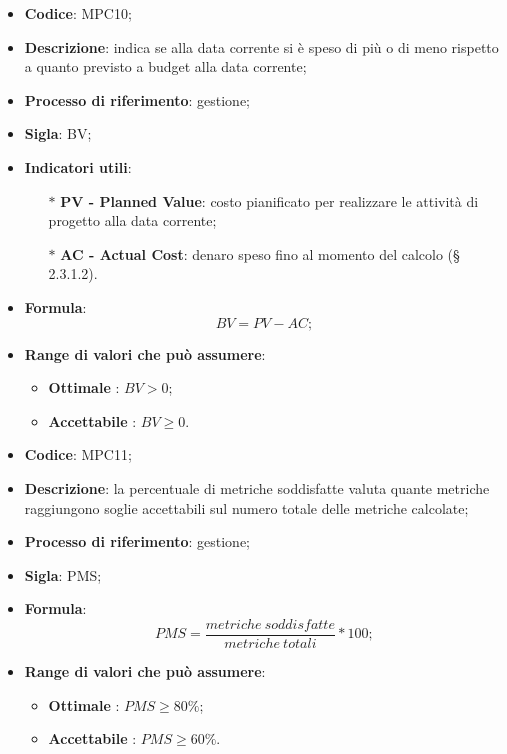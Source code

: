 \vspace{-1cm}
\begin{itemize}
	\item \textbf{Codice}: MPC10;
	\item \textbf{Descrizione}: indica se alla data corrente si è speso di più o di meno rispetto a quanto previsto a budget alla data corrente;
	\item \textbf{Processo di riferimento}: gestione;
	\item \textbf{Sigla}: BV;
	\item \textbf{Indicatori utili}: 
		\begin{itemize}
			\item[$\ast$] \textbf{PV - Planned Value}: costo pianificato per realizzare le attività di progetto alla data corrente;
			\item[$\ast$] \textbf{AC - Actual Cost}: denaro speso fino al momento del calcolo (§ 2.3.1.2).
		\end{itemize}
	\item \textbf{Formula}: \[ BV = PV - AC;\]
	\item \textbf{Range di valori che può assumere}: 
		\begin{itemize}
			\item \textbf{Ottimale} : $BV > 0$;
			\item \textbf{Accettabile} : $BV \geq 0$.
		\end{itemize}
\end{itemize}


\vspace{-1cm}
\begin{itemize}
	\item \textbf{Codice}: MPC11;
	\item \textbf{Descrizione}: la percentuale di metriche soddisfatte valuta quante metriche raggiungono soglie accettabili sul numero totale delle metriche calcolate;
	\item \textbf{Processo di riferimento}: gestione;
	\item \textbf{Sigla}: PMS;
	\item \textbf{Formula}: \[ PMS = \frac{metriche \ soddisfatte}{metriche \ totali} \ast 100;\]
	\item \textbf{Range di valori che può assumere}: 
		\begin{itemize}
			\item \textbf{Ottimale} : $PMS \geq 80 \%$;
			\item \textbf{Accettabile} : $PMS \geq 60 \%$.
		\end{itemize}
\end{itemize}